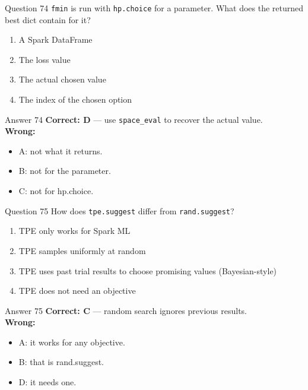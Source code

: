 \documentclass[aspectratio=169,11pt]{beamer}
\begin{document}
	\begin{frame}{Question 74}
		\texttt{fmin} is run with \texttt{hp.choice} for a parameter. What does the returned best dict contain for it?
		\begin{enumerate}[label=\Alph*.]
			\item A Spark DataFrame
			\item The loss value
			\item The actual chosen value
			\item The index of the chosen option
		\end{enumerate}
	\end{frame}
	\begin{frame}{Answer 74}
		\textbf{Correct: D} --- use \texttt{space\_eval} to recover the actual value.\\
		\vspace{0.5em}
		\textbf{Wrong:}
		\begin{itemize}
			\item A: not what it returns.
			\item B: not for the parameter.
			\item C: not for hp.choice.
		\end{itemize}
	\end{frame}
	
	\begin{frame}{Question 75}
		How does \texttt{tpe.suggest} differ from \texttt{rand.suggest}?
		\begin{enumerate}[label=\Alph*.]
			\item TPE only works for Spark ML
			\item TPE samples uniformly at random
			\item TPE uses past trial results to choose promising values (Bayesian-style)
			\item TPE does not need an objective
		\end{enumerate}
	\end{frame}
	\begin{frame}{Answer 75}
		\textbf{Correct: C} --- random search ignores previous results.\\
		\vspace{0.5em}
		\textbf{Wrong:}
		\begin{itemize}
			\item A: it works for any objective.
			\item B: that is rand.suggest.
			\item D: it needs one.
		\end{itemize}
	\end{frame}
	
\end{document}

